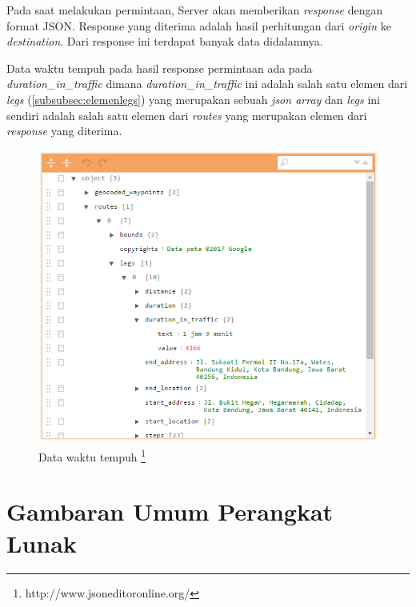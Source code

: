 Pada saat melakukan permintaan, Server akan memberikan \textit{response} dengan format JSON. Response yang diterima adalah hasil perhitungan dari \textit{origin} ke \textit{destination}. Dari response ini terdapat banyak data didalamnya.

Data waktu tempuh pada hasil response permintaan ada pada \textit{duration\_in\_traffic} dimana \textit{duration\_in\_traffic} ini adalah salah satu elemen dari \textit{legs} (\ref{subsubsec:elemenlegs}) yang merupakan sebuah \textit{json array} dan \textit{legs} ini sendiri adalah salah satu elemen dari \textit{routes} yang merupakan elemen dari \textit{response} yang diterima.

\begin{figure}[H]
				\centering		
				\includegraphics[scale=0.6]{Gambar/duration_in_traffic.png}
				\caption[Data waktu tempuh]{Data waktu tempuh \footnote{http://www.jsoneditoronline.org/}}
				\label{fig:durationintraffic}	
			\end{figure}

\section{Gambaran Umum Perangkat Lunak}
\label{sec:gambaranumum}

